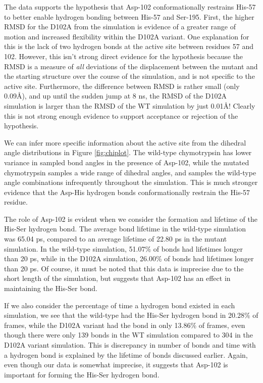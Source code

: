 \documentclass[11pt, twocolumn]{article}
\begin{document}
The data supports the hypothesis that Asp-102 conformationally restrains His-57
to better enable hydrogen bonding between His-57 and Ser-195.
First, the higher RMSD for the D102A from the simulation is evidence of a
greater range of motion and increased flexibility within the D102A variant.
One explanation for this is the lack of two hydrogen bonds at the active site
between residues 57 and 102. However, this isn't strong direct evidence for
the hypothesis because the RMSD is a measure of \textit{all} deviations of
the displacement between the mutant and the starting structure over the course
of the simulation, and is not specific to the active site. Furthermore, the
difference between RMSD is rather small (only 0.09\AA{}), and up until the
sudden jump at 8 ns, the RMSD of the D102A simulation is larger than the RMSD
of the WT simulation by just 0.01\AA{}! Clearly this is not strong enough
evidence to support acceptance or rejection of the hypothesis.

We can infer more specific information about the active site from the dihedral
angle distributions in Figure \ref{fig:chiplot}. The wild-type chymotrypsin
has lower variance in sampled bond angles in the presence of Asp-102, while
the mutated chymotrypsin samples a wide range of dihedral angles, and
samples the wild-type angle combinations infrequently throughout the simulation.
This is much stronger evidence that the Asp-His hydrogen bonds conformationally
restrain the His-57 residue.

The role of Asp-102 is evident when we consider the formation and lifetime
of the His-Ser hydrogen bond. The average bond lifetime in the wild-type
simulation was 65.04 ps, compared to an average lifetime of 22.80 ps in the
mutant simulation. In the wild-type simulation, 51.07\% of bonds had lifetimes
longer than 20 ps, while in the D102A simulation, 26.00\% of bonds had lifetimes
longer than 20 ps. Of course, it must be noted that this data is imprecise
due to the short  length of the simulation, but suggests that Asp-102 has an
effect in maintaining the His-Ser bond.

If we also consider the percentage of time a hydrogen bond existed in each
simulation, we see that the wild-type had the His-Ser hydrogen bond in
20.28\% of frames, while the D102A variant had the bond in only 13.86\% of
frames, even though there were only 139 bonds in the WT simulation compared
to 304 in the D102A variant simulation. This is discrepancy in number of bonds
and time with a hydrogen bond is explained by the lifetime of bonds discussed
earlier. Again, even though our data is somewhat imprecise, it suggests that
Asp-102 is important for forming the His-Ser hydrogen bond.
\end{document}
